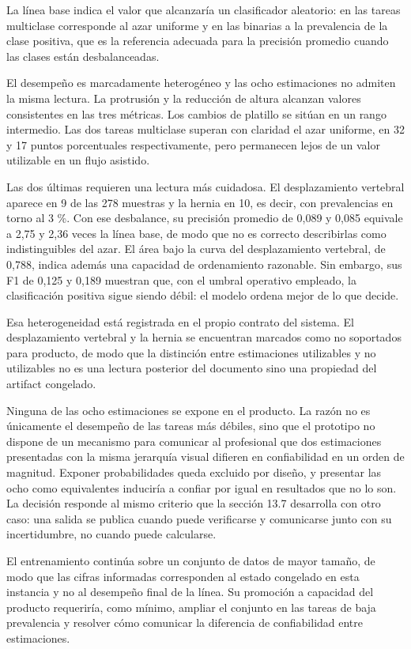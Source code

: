 La línea base indica el valor que alcanzaría un clasificador aleatorio: en las tareas multiclase corresponde al azar uniforme y en las binarias a la prevalencia de la clase positiva, que es la referencia adecuada para la precisión promedio cuando las clases están desbalanceadas.

El desempeño es marcadamente heterogéneo y las ocho estimaciones no admiten la misma lectura. La protrusión y la reducción de altura alcanzan valores consistentes en las tres métricas. Los cambios de platillo se sitúan en un rango intermedio. Las dos tareas multiclase superan con claridad el azar uniforme, en 32 y 17 puntos porcentuales respectivamente, pero permanecen lejos de un valor utilizable en un flujo asistido.

Las dos últimas requieren una lectura más cuidadosa. El desplazamiento vertebral aparece en 9 de las 278 muestras y la hernia en 10, es decir, con prevalencias en torno al 3 \%. Con ese desbalance, su precisión promedio de 0,089 y 0,085 equivale a 2,75 y 2,36 veces la línea base, de modo que no es correcto describirlas como indistinguibles del azar. El área bajo la curva del desplazamiento vertebral, de 0,788, indica además una capacidad de ordenamiento razonable. Sin embargo, sus F1 de 0,125 y 0,189 muestran que, con el umbral operativo empleado, la clasificación positiva sigue siendo débil: el modelo ordena mejor de lo que decide.

Esa heterogeneidad está registrada en el propio contrato del sistema. El desplazamiento vertebral y la hernia se encuentran marcados como no soportados para producto, de modo que la distinción entre estimaciones utilizables y no utilizables no es una lectura posterior del documento sino una propiedad del artifact congelado.

Ninguna de las ocho estimaciones se expone en el producto. La razón no es únicamente el desempeño de las tareas más débiles, sino que el prototipo no dispone de un mecanismo para comunicar al profesional que dos estimaciones presentadas con la misma jerarquía visual difieren en confiabilidad en un orden de magnitud. Exponer probabilidades queda excluido por diseño, y presentar las ocho como equivalentes induciría a confiar por igual en resultados que no lo son. La decisión responde al mismo criterio que la sección 13.7 desarrolla con otro caso: una salida se publica cuando puede verificarse y comunicarse junto con su incertidumbre, no cuando puede calcularse.

El entrenamiento continúa sobre un conjunto de datos de mayor tamaño, de modo que las cifras informadas corresponden al estado congelado en esta instancia y no al desempeño final de la línea. Su promoción a capacidad del producto requeriría, como mínimo, ampliar el conjunto en las tareas de baja prevalencia y resolver cómo comunicar la diferencia de confiabilidad entre estimaciones.

